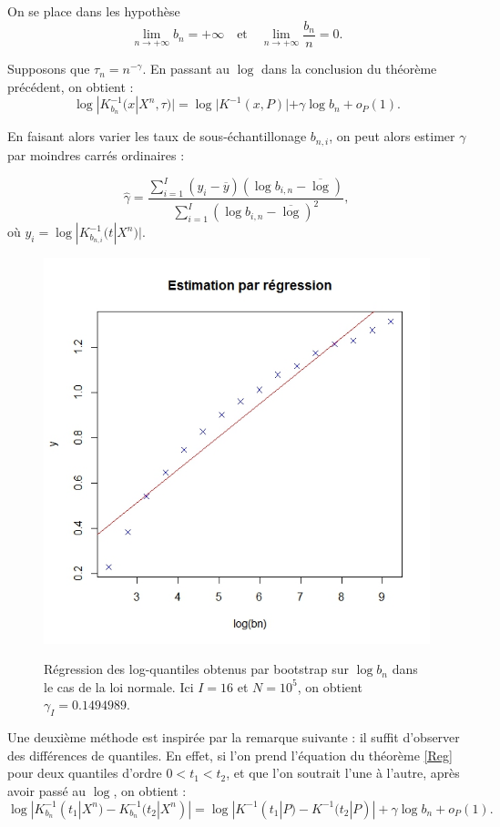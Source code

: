 \documentclass{article}
\theoremstyle{definition}
\begin{document}
On se place dans les hypothèse \[\lim_{n\rightarrow +\infty} b_n=+\infty \quad \text{et}\quad\lim_{n\rightarrow +\infty}\frac{b_n}{n}=0.\]

Supposons que $\tau_n=n^{-\gamma}$. En passant au $\log$ dans la conclusion du théorème précédent, on obtient :
\[\log |K^{-1}_{b_n}(x|X^n,\tau)|=\log |K^{-1}(x,P)| + \gamma \log b_n +o_P(1).\]

En faisant alors varier les taux de sous-échantillonage $b_{n,i}$, on peut alors estimer $\gamma$ par moindres carrés ordinaires :

\[\hat\gamma=\frac{\sum_{i=1}^I(y_i-\overline y)(\log b_{i,n}-\overline\log)}{\sum_{i=1}^I(\log b_{i,n}-\overline\log)^2},\]
où $y_i=\log |K^{-1}_{b_{n,i}}(t|X^n)|$.\\

\begin{figure}[!h]\centering
\includegraphics[scale=0.4]{RegGauss.jpeg}
\label{RegGauss}
\caption{Régression des log-quantiles obtenus par bootstrap sur $\log b_n$ dans le cas de la loi normale.
 Ici $I=16$ et $N=10^5$, on obtient $\gamma_I=0.1494989$.}
\end{figure}

Une deuxième méthode est inspirée par la remarque suivante : il  suffit d'observer des différences de quantiles. En effet, si l'on prend l'équation du théorème \ref{Reg} pour deux quantiles d'ordre $0<t_1<t_2$, et que l'on soutrait l'une à l'autre, après avoir passé au $\log$, on obtient :
\[\log|K^{-1}_{b_{n}}(t_1|X^n)-K^{-1}_{b_{n}}(t_2|X^n)| =\log|K^{-1}(t_1|P)-K^{-1}(t_2|P)|  + \gamma \log b_n +o_P(1).\]
\end{document}
